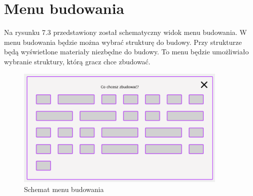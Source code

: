 \section{Menu budowania}

Na rysunku 7.3 przedstawiony został schematyczny widok menu budowania.
W menu budowania będzie można wybrać strukturę do budowy. Przy strukturze będą wyświetlone materiały niezbędne do budowy. To menu będzie umożliwiało wybranie struktury, którą gracz chce zbudować.

\begin{figure}[H]
    \centering
        \includegraphics[width=0.9\textwidth]{Graphics/interface/building_menu.png}
        \caption{Schemat menu budowania}
\end{figure}